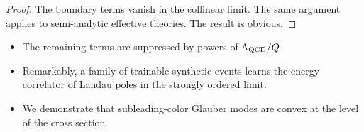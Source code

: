 \begin{proof}
The boundary terms vanish in the collinear limit. The same argument
applies to semi-analytic effective theories. The result is obvious.
\end{proof}

\begin{itemize}
  \item The remaining terms are suppressed by powers of $\Lambda_{\rm QCD}/Q$.
  \item Remarkably, a family of trainable synthetic events learns the energy correlator of Landau poles in the strongly ordered limit.
  \item We demonstrate that subleading-color Glauber modes are convex at the level of the cross section.
\end{itemize}

